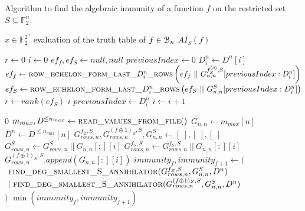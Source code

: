 \documentclass[11pt]{llncs}
\begin{document}
\begin{algorithm}\label{alg:RMApproach}
	\caption{Algorithm to find the algebraic immunity of a function $f$ on the restricted set $S\subseteq \mathbb{F}_2^n$.}
	\begin{algorithmic}[1]
		\Require $x\in \mathbb{F}_2^{2^n}$ evaluation of the truth table of $f\in \mathcal{B}_{n}$
		\Ensure $AI_S(f)$
		
		\State $r \gets 0$
		\State $i \gets 0$
		\State $ef_f, ef_S \gets null, null$
		\State $previousIndex \gets 0$
		\State $D_i^n \gets D^n[i]$
		\State $ef_f\gets \mbox{\textsc{row\_echelon\_form\_last\_}}D_i^n\mbox{\textsc{\_rows}}\left(ef_f\ ||\  G_{n,n}^{f_Z^{(o)},S}[previousIndex:D_i^n]\right)$\footnotemark[1]
		\State $ef_S \gets \mbox{\textsc{row\_echelon\_form\_last\_}}D_i^n\mbox{\textsc{\_rows}}\left(ef_S\ ||\ G_{n,n}^S[previousIndex:D_i^n]\right)$
		\State $r \gets rank\left(ef_S\right)$
		\State
		\Return $i$
		\EndIf
		\State $previousIndex \gets D_i^n$
		\State $i \gets i+1$
		\EndWhile
		\EndFunction
		\State
		
		\Return $0$
		\EndIf
		\State $m_{max}, D^{\leq n_{max}}\gets \mbox{\textsc{read\_values\_from\_file}}()$
		\State $G_{n,n}\gets m_{max}[n]$
		\State $D^n \gets D^{\leq n_{max}}[n]$
		\State $G_{rows,n}^{f_Z,S}, G_{rows,n}^{(f\oplus 1)_Z,S}, G_{n,n}^S \gets [\ ], [\ ], [\ ]$
		\State $G_{rows,n}^{S} \gets G_{rows,n}^{S}\ ||\ G_{n,n}[:][i]$
		\State $G_{rows,n}^{f_S,S} \gets G_{rows,n}^{f_S,S}\ ||\ G_{n,n}[:][i]$
		\Else
		\State $G_{rows,n}^{(f\oplus 1)_S,S}.append\left(G_{n,n}[:][i]\right)$
		\EndIf
		\EndIf
		\EndFor
		\State $immunity_f, immunity_{f+1} \leftarrow ($\\
		$\ \mbox{\textsc{find\_deg\_smallest\_S\_annihilator}}(G_{rows,n}^{f_Z,S}, G_{n,n}^S,D^{n})$\\
		$\ |\ \mbox{\textsc{find\_deg\_smallest\_S\_annihilator}}(G_{rows,n}^{(f\oplus 1)_Z,S}, G_{n,n}^S, D^{n})$\\
		$)$
		\State \Return $\min(immunity_f, immunity_{f+1})$\footnotemark[2]
	\end{algorithmic}
\end{algorithm}

\end{document}
